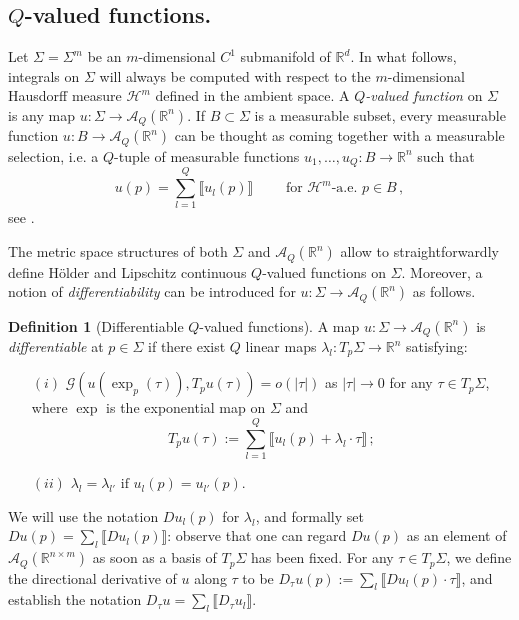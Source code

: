 \documentclass[a4paper,11pt,reqno]{amsart}
\newtheorem{proposition}[theorem]{Proposition}
\theoremstyle{definition}
\newtheorem{definition}[theorem]{Definition}
\numberwithin{equation}{section}
\numberwithin{subsection}{section}
\newcommand{\R}{\mathbb{R}}
\newcommand{\A}{\mathcal{A}}
\newcommand{\G}{\mathcal{G}}
\newcommand{\Ha}{\mathcal{H}}
\begin{document}
\subsection{$Q$-valued functions.} Let $\Sigma = \Sigma^{m}$ be an $m$-dimensional $C^{1}$ submanifold of $\R^{d}$. In what follows, integrals on $\Sigma$ will always be computed with respect to the $m$-dimensional Hausdorff measure $\Ha^{m}$ defined in the ambient space. A \emph{$Q$-valued function} on $\Sigma$ is any map $u \colon \Sigma \to \A_{Q}(\R^n)$. 
If $B \subset \Sigma$ is a measurable subset, every measurable function $u \colon B \to \A_{Q}(\R^n)$ can be thought as coming together with a measurable selection, i.e. a $Q$-tuple of measurable functions $u_1,\dots,u_Q \colon B \to \R^n$ such that
\begin{equation}
u(p) = \sum_{l=1}^{Q} \llbracket u_{l}(p) \rrbracket \qquad \mbox{ for $\Ha^m$-a.e. } p \in B\,,
\end{equation}
see \cite[Proposition 0.4]{DLS11a}.
%
%

The metric space structures of both $\Sigma$ and $\A_{Q}(\R^n)$ allow to straightforwardly define H\"older and Lipschitz continuous $Q$-valued functions on $\Sigma$. Moreover, a notion of \emph{differentiability} can be introduced for $u \colon \Sigma \to \A_{Q}(\R^n)$ as follows.
\begin{definition}[Differentiable $Q$-valued functions] \label{differentiable}
A map ${u \colon \Sigma \to \A_{Q}(\R^n)}$ is \emph{differentiable} at $p \in \Sigma$ if there exist $Q$ linear maps $\lambda_{l} \colon T_{p}\Sigma \to \R^n$ satisfying:
\begin{itemize}
\item[$(i)$] $\G\left( u(\exp_{p}(\tau)), T_{p}u(\tau) \right) = o(|\tau|)$ as $|\tau| \to 0$ for any $\tau \in T_{p}\Sigma$, where $\exp$ is the exponential map on $\Sigma$ and 
\begin{equation}
T_{p}u(\tau) := \sum_{l=1}^{Q} \llbracket u_{l}(p) + \lambda_{l} \cdot \tau \rrbracket\,;
\end{equation}
\item[$(ii)$] $\lambda_{l} = \lambda_{l'} \mbox{ if } u_{l}(p) = u_{l'}(p)$.
\end{itemize}
\end{definition}
We will use the notation $Du_{l}(p)$ for $\lambda_{l}$, and formally set $Du(p) = \sum_{l} \llbracket Du_{l}(p) \rrbracket$: observe that one can regard $Du(p)$ as an element of $\A_{Q}(\R^{n \times m})$ as soon as a basis of $T_{p}\Sigma$ has been fixed. For any $\tau \in T_{p}\Sigma$, we define the directional derivative of $u$ along $\tau$ to be $D_{\tau}u(p) := \sum_{l} \llbracket Du_{l}(p) \cdot \tau \rrbracket$, and establish the notation $D_{\tau}u = \sum_{l} \llbracket D_{\tau}u_l \rrbracket$.
\end{document}
